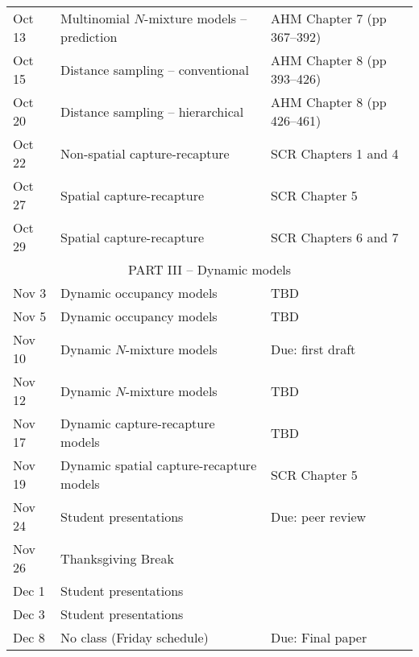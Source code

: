 \documentclass[12pt]{article}
\begin{document}
\begin{center}
\begin{tabular}[c]{lll}
\hline
Oct 13     & Multinomial $N$-mixture models -- prediction & AHM Chapter 7 (pp 367--392)      \\
Oct 15     & Distance sampling -- conventional            & AHM Chapter 8 (pp 393--426)      \\
\hline
Oct 20     & Distance sampling -- hierarchical            & AHM Chapter 8 (pp 426--461)      \\
Oct 22     & Non-spatial capture-recapture                & SCR Chapters 1 and 4             \\
\hline
Oct 27     & Spatial capture-recapture                    & SCR Chapter 5                    \\
Oct 29     & Spatial capture-recapture                    & SCR Chapters 6 and 7             \\
\hline
           \multicolumn{3}{c}{PART III -- Dynamic models}                                    \\
\hline
Nov 3      & Dynamic occupancy models                     & TBD                              \\
Nov 5      & Dynamic occupancy models                     & TBD                              \\
\hline
Nov 10     & Dynamic $N$-mixture models                   & Due: first draft                 \\
Nov 12     & Dynamic $N$-mixture models                   & TBD                              \\
\hline
Nov 17     & Dynamic capture-recapture models             & TBD                              \\
Nov 19     & Dynamic spatial capture-recapture models     & SCR Chapter 5                    \\
\hline
Nov 24     & Student presentations                        & Due: peer review                 \\
Nov 26     & Thanksgiving Break                           &                                  \\
\hline
Dec 1      & Student presentations                        &                                  \\
Dec 3      & Student presentations                        &                                  \\
\hline
Dec 8      & No class (Friday schedule)                   & Due: Final paper                 \\
\hline \hline
\end{tabular}
\end{center}
\end{document}

